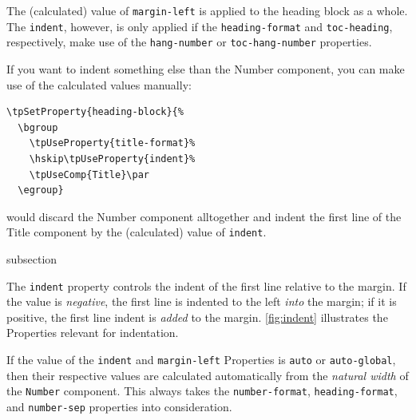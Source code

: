 The (calculated) value of \lstinline{margin-left} is applied to the
heading block as a whole. The \lstinline{indent}, however, is only
applied if the \lstinline{heading-format} and \lstinline{toc-heading},
respectively, make use of the \lstinline{hang-number} or
\lstinline{toc-hang-number} properties.

If you want to indent something else than the Number component, you
can make use of the calculated values manually:
\begin{lstlisting}
\tpSetProperty{heading-block}{%
  \bgroup
    \tpUseProperty{title-format}%
    \hskip\tpUseProperty{indent}%
    \tpUseComp{Title}\par
  \egroup}
\end{lstlisting}
would discard the Number component alltogether and indent the first
line of the Title component by the (calculated) value of
\lstinline{indent}.

\begin{heading}[label=sec:hdg:hd-indent]{subsection}
\end{heading}

The \lstinline{indent} property controls the indent of the first line
relative to the margin. If the value is \textit{negative}, the first
line is indented to the left \textit{into} the margin; if it is
positive, the first line indent is \textit{added} to the
margin. \ref{fig:indent} illustrates the Properties relevant for
indentation.

\begin{tpFigure}[float-pos=b!]
  \label{fig:indent}
\end{tpFigure}

If the value of the \lstinline{indent} and \lstinline{margin-left}
Properties is \texttt{auto} or \texttt{auto-global}, then their
respective values are calculated automatically from the
\textit{natural width} of the \lstinline{Number} component. This
always takes the \lstinline{number-format},
\lstinline{heading-format}, and \lstinline{number-sep} properties into
consideration.

